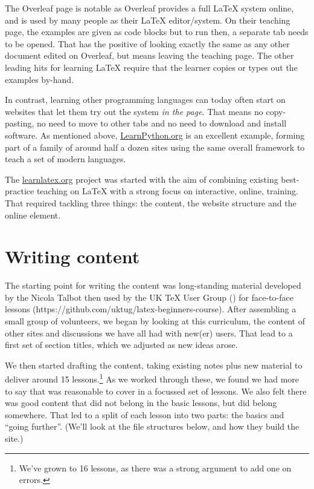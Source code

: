 \documentclass[harvardcite]{ltugboat}
\begin{document}
The Overleaf page is notable as Overleaf provides a full \LaTeX{} system
online, and is used by many people as their \LaTeX{} editor/system. On their
teaching page, the examples are given as code blocks but to run then, a
separate tab needs to be opened. That has the positive of looking exactly the
same as any other document edited on Overleaf, but means leaving the teaching
page. The other leading hits for learning \LaTeX{} require that the learner
copies or types out the examples by-hand.

In contrast, learning other programming languages can today often start on
websites that let them try out the system \emph{in the page}. That means
no copy-pasting, no need to move to other tabs and no need to download and
install software. As mentioned above, \url{LearnPython.org} is an excellent
example, forming part of a family of around half a dozen sites using the
same overall framework to teach a set of modern languages.

The \url{learnlatex.org} project was started with the aim of combining existing
best-practice teaching on \LaTeX{} with a strong focus on interactive, online,
training. That required tackling three things: the content, the website
structure and the online element.

\section{Writing content}

The starting point for writing the content was long-standing material developed
by the Nicola Talbot then used by the UK \TeX{} User Group () for
face-to-face lessons (https://github.com/uktug/latex-beginners-course). After 
assembling a small group of volunteers, we began by looking at this curriculum,
the content of other sites and discussions we have all had with new(er) users.
That lead to a first set of section titles, which we adjusted as new ideas
arose.

We then started drafting the content, taking existing notes plus new material
to deliver around 15 lessons.\footnote{We've grown to 16 lessons, as there was
a strong argument to add one on errors.} As we worked through these, we found
we had more to say that was reasonable to cover in a focussed set of lessons.
We also felt there was good content that did not belong in the basic lessons,
but did belong somewhere. That led to a split of each lesson into two parts:
the basics and \enquote{going further}. (We'll look at the file structures
below, and how they build the site.)
\end{document}
